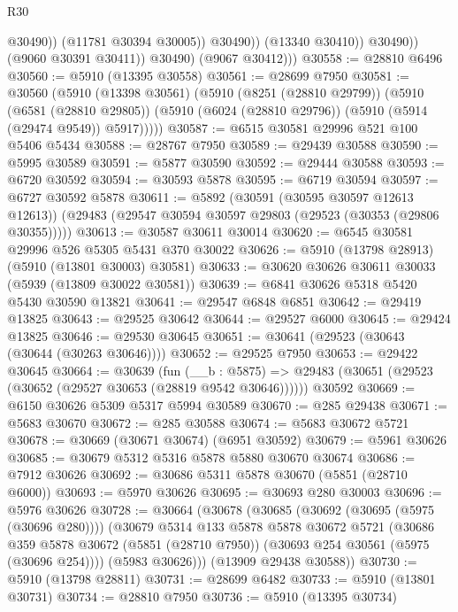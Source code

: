 \begin{lexlean}{R30}
\begin{coremodule}
                            @30490))
                        (@11781 @30394 @30005))
                      @30490))
                  (@13340 @30410))
                @30490))
            (@9060 @30391 @30411))
          @30490)
        (@9067 @30412)))
@30558 := @28810 @6496
@30560 := @5910 (@13395 @30558)
@30561 := @28699 @7950
@30581 := @30560
    (@5910
      (@13398 @30561)
      (@5910
        (@8251 (@28810 @29799))
        (@5910
          (@6581 (@28810 @29805))
          (@5910 (@6024 (@28810 @29796)) (@5910 (@5914 (@29474 @9549)) @5917)))))
@30587 := @6515 @30581 @29996 @521 @100 @5406 @5434
@30588 := @28767 @7950
@30589 := @29439 @30588
@30590 := @5995 @30589
@30591 := @5877 @30590
@30592 := @29444 @30588
@30593 := @6720 @30592
@30594 := @30593 @5878
@30595 := @6719 @30594
@30597 := @6727 @30592 @5878
@30611 := @5892
    (@30591 (@30595 @30597 @12613 @12613))
    (@29483 (@29547 @30594 @30597 @29803 (@29523 (@30353 (@29806 @30355)))))
@30613 := @30587 @30611 @30014
@30620 := @6545 @30581 @29996 @526 @5305 @5431 @370 @30022
@30626 := @5910 (@13798 @28913) (@5910 (@13801 @30003) @30581)
@30633 := @30620 @30626 @30611 @30033 (@5939 (@13809 @30022 @30581))
@30639 := @6841 @30626 @5318 @5420 @5430 @30590 @13821
@30641 := @29547 @6848 @6851
@30642 := @29419 @13825
@30643 := @29525 @30642
@30644 := @29527 @6000
@30645 := @29424 @13825
@30646 := @29530 @30645
@30651 := @30641 (@29523 (@30643 (@30644 (@30263 @30646))))
@30652 := @29525 @7950
@30653 := @29422 @30645
@30664 := @30639
    (fun (__b : @5875) => @29483 (@30651 (@29523 (@30652 (@29527 @30653 (@28819 @9542 @30646))))))
    @30592
@30669 := @6150 @30626 @5309 @5317 @5994 @30589
@30670 := @285 @29438
@30671 := @5683 @30670
@30672 := @285 @30588
@30674 := @5683 @30672 @5721
@30678 := @30669 (@30671 @30674) (@6951 @30592)
@30679 := @5961 @30626
@30685 := @30679 @5312 @5316 @5878 @5880 @30670 @30674
@30686 := @7912 @30626
@30692 := @30686 @5311 @5878 @30670 (@5851 (@28710 @6000))
@30693 := @5970 @30626
@30695 := @30693 @280 @30003
@30696 := @5976 @30626
@30728 := @30664
    (@30678
      (@30685
        (@30692 (@30695 (@5975 (@30696 @280))))
        (@30679
          @5314
          @133
          @5878
          @5878
          @30672
          @5721
          (@30686
            @359
            @5878
            @30672
            (@5851 (@28710 @7950))
            (@30693 @254 @30561 (@5975 (@30696 @254))))
          (@5983 @30626)))
      (@13909 @29438 @30588))
@30730 := @5910 (@13798 @28811)
@30731 := @28699 @6482
@30733 := @5910 (@13801 @30731)
@30734 := @28810 @7950
@30736 := @5910 (@13395 @30734)

\end{coremodule}
\end{lexlean}
